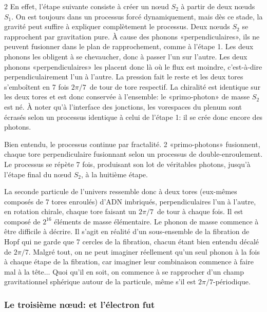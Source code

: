 \begin{multicols}{2}
En effet, l'étape suivante consiste à créer un nœud $S_2$ à partir de
deux nœuds $S_1$. On est toujours dans un processus forcé dynamiquement,
mais dès ce stade, la gravité peut suffire à expliquer complètement le
processus. Deux nœuds $S_2$ se rapprochent par gravitation pure. À cause
des phonons «perpendiculaires», ils ne peuvent fusionner dans le
plan de rapprochement, comme à l'étape 1. Les deux phonons les
obligent à se chevaucher, donc à passer l'un sur l'autre. Les deux
phonons «perpendiculaires» les placent donc là où le flux est 
moindre, c'est-à-dire perpendiculairement l'un à l'autre. La pression fait le
reste et les deux tores s'emboîtent en 7 fois $2\pi/7$\ieme\ de tour de tore
respectif. La chiralité est identique sur les deux tores et est donc
conservée à l'ensemble: le «primo-photon» de masse $S_2$ est né. À
noter qu'à l'interface des jonctions, les vorespaces du plenum sont
écrasés selon un processus identique à celui de l'étape 1: il se crée donc
encore des photons.

Bien entendu, le processus continue par fractalité. 2
«primo-photons» fusionnent, chaque tore perpendiculaire fusionnant
 selon un processus de double-enroulement. Le processus se
répète 7 fois, produisant son lot de véritables photons, jusqu'à
l'étape final du nœud $S_2$, à la huitième étape.

La seconde particule de l'univers ressemble donc à deux tores
(eux-mêmes composés de 7 tores enroulés) d'ADN imbriqués,
perpendiculaires l'un à l'autre, en rotation chirale, chaque tore
faisant un $2\pi/7$\ieme\ de tour à chaque fois. Il est composé de $2^{16}$
éléments de masse élémentaire. Le phonon de masse commence à être
difficile à décrire. Il s'agit en réalité d'un sous-ensemble de la
fibration de Hopf qui ne garde que 7 cercles de la fibration, chacun
étant bien entendu décalé de $2\pi/7$. Malgré tout, on ne peut imaginer
réellement qu'un seul phonon à la fois à chaque étape de la fibration, car imaginer leur
combinaison commence à faire mal à la tête$\ldots$ Quoi qu'il en soit, on
commence à se rapprocher d'un champ gravitationnel sphérique autour de
la particule, même s'il est $2\pi/7$-périodique.

\subsubsection{Le troisième nœud: et l'électron fut}


\end{multicols}
